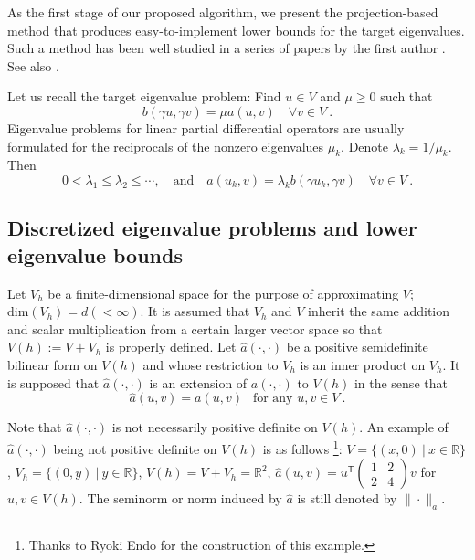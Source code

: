 \documentclass[a4,11pt]{article}
\numberwithin{equation}{section}
\newcommand{\R}{\mathbb{R}}
\begin{document}
As the first stage of our proposed algorithm, we present the projection-based method that produces easy-to-implement lower bounds for the target eigenvalues. Such a method has been well studied in a series of papers by the first author \cite{Liu-Oishi-2013,Liu-2015,liu2020explicit}. See also  \cite{Birkhoff_etal1966,Kikuchi+Liu2007,Kobayashi2015,Carstensen2014}.



 Let us recall the target eigenvalue problem:  Find $u \in V$ and $\mu \ge 0$ such that
\begin{equation}
\label{eq:new-formulation-eig}
b(\gamma u, \gamma v) = \mu a(u,v)\quad \forall v \in V\:.
\end{equation}
Eigenvalue problems for linear partial differential operators are usually formulated for the reciprocals of the nonzero eigenvalues $\mu_k$. Denote $\lambda_k = 1/\mu_k$. Then 
\begin{equation}
	\label{eq:eig-problem-with-lambda}
  0 < \lambda_1 \leq \lambda_2 \leq \cdots,
  \quad\text{and}\quad 
  a(u_k, v) = \lambda_k b(\gamma u_k, \gamma v)\quad \forall v \in V~.
\end{equation}

\subsection{Discretized eigenvalue problems and lower eigenvalue bounds}
\label{subsec:lower-bound}
Let $V_h$ be a finite-dimensional space for the purpose of  approximating $V$; $\mbox{dim}(V_h)=d (<\infty)$. It is assumed that $V_h$ and $V$ inherit the same addition and scalar multiplication from a certain larger vector space so that $V(h):=V+V_h$ is properly defined. 
Let $\widehat{a}(\cdot, \cdot)$ be a positive semidefinite bilinear form on $V(h)$ and whose restriction to $V_h$ is an inner product on  $V_h$. It is supposed that $\widehat{a}(\cdot, \cdot)$ is an extension of $a(\cdot, \cdot)$ to $V(h)$ in the sense that 
$$
\widehat{a}(u, v ) = a(u, v )~~\mbox{ for any } u, v \in V\:.
$$

Note that 
$\widehat{a}(\cdot, \cdot)$ is not necessarily positive definite on $V(h)$. An example of $\widehat{a}(\cdot, \cdot)$ being not positive definite on $V(h)$ is as follows \footnote{Thanks to Ryoki Endo for the construction of this example.}: $V=\{(x,0)\:|\:x\in \R\}$, $V_h=\{(0,y)\:|\:y\in \R\}$,  $V(h)=V+V_h=\mathbb{R}^2$,  
$\widehat{a}(u,v)=u^{\mathsf{T}} \begin{pmatrix}
 1 & 2 \\ 2 & 4 \end{pmatrix} v$ for $u,v\in V(h)$. 
The seminorm or norm induced by $\widehat{a}$ is still denoted by 
$\|\cdot\|_a$.
\end{document}
